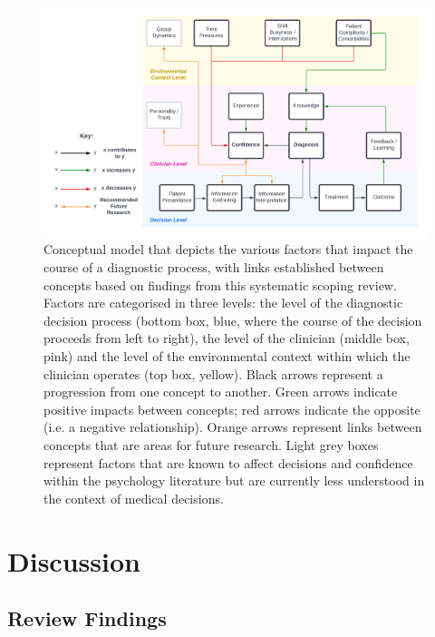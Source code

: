 \documentclass[a4paper, nobind]{templates/ociamthesis}
\begin{document}
\begin{figure}[H]

{\centering \includegraphics[width=1\linewidth]{./assets/ReviewModel} 

}

\caption[Scoping Review: Conceptual Model]{Conceptual model that depicts the various factors that impact the course of a diagnostic process, with links established between concepts based on findings from this systematic scoping review. Factors are categorised in three levels: the level of the diagnostic decision process (bottom box, blue, where the course of the decision proceeds from left to right), the level of the clinician (middle box, pink) and the level of the environmental context within which the clinician operates (top box, yellow). Black arrows represent a progression from one concept to another. Green arrows indicate positive impacts between concepts; red arrows indicate the opposite (i.e. a negative relationship). Orange arrows represent links between concepts that are areas for future research. Light grey boxes represent factors that are known to affect decisions and confidence within the psychology literature but are currently less understood in the context of medical decisions.}\label{fig:reviewmodel}
\end{figure}

\section{Discussion}\label{discussion}

\subsection{Review Findings}\label{review-findings}
\end{document}
